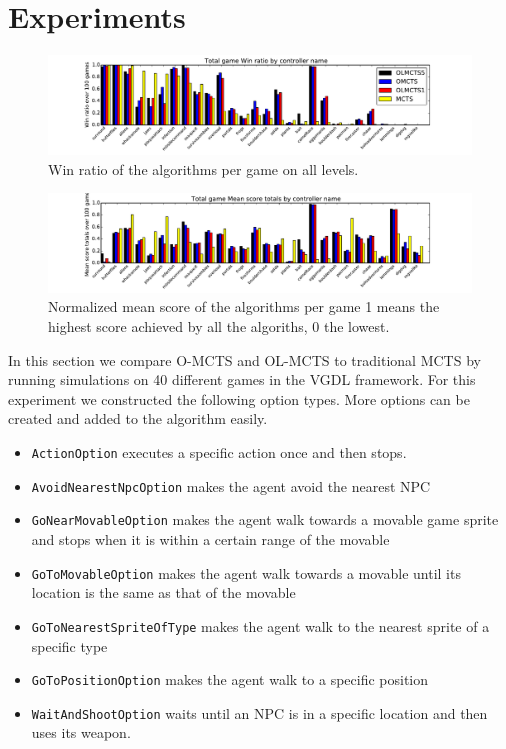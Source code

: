 \section{Experiments}
\label{sec:experiments}
\begin{figure}
	\centering
	\includegraphics[width=\textwidth]{includes/wins}
	\vspace{-.8cm}
	\caption{Win ratio of the algorithms per game on all levels.}
	\label{fig:wins}
\end{figure}

\begin{figure}
	\centering
	\includegraphics[width=\textwidth]{includes/scores}
	\vspace{-.8cm}
	\caption{Normalized mean score of the algorithms per game 1 means the
	highest score achieved by all the algoriths, 0 the lowest.}
	\label{fig:scores}
\end{figure}

In this section we compare O-MCTS and OL-MCTS to traditional MCTS by running
simulations on 40 different games in the VGDL framework. For this experiment
we constructed the following option types. More options can be created and added
to the algorithm easily.

\begin{itemize}[noitemsep]
	\item \texttt{ActionOption} executes a specific action once and then
		stops.
	\item \texttt{AvoidNearestNpcOption} makes the agent avoid the nearest NPC
	\item \texttt{GoNearMovableOption} makes the agent walk towards a
		movable game sprite and stops when it is within a certain range of the
		movable
	\item \texttt{GoToMovableOption} makes the agent walk towards a
		movable until its location is the same as that of the movable
	\item \texttt{GoToNearestSpriteOfType} makes the agent walk to the nearest sprite of
		a specific type
	\item \texttt{GoToPositionOption} makes the agent walk to a specific position
	\item \texttt{WaitAndShootOption} waits until an NPC is in a specific location and
		then uses its weapon.
\end{itemize}


